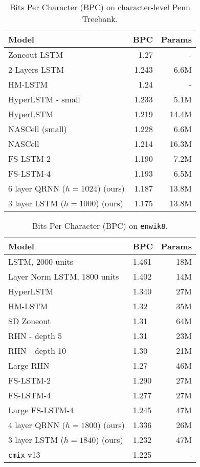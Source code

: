 \documentclass{article}
\newcommand{\enwik}{\texttt{enwik8}\xspace}
\begin{document}
\begin{table}
\begin{center}
 \begin{tabular}{@{}l r r@{}}
\toprule[1.5pt]
Model & BPC & Params \\
\midrule
Zoneout LSTM \cite{Krueger2016}& 1.27 & -\\
2-Layers LSTM \cite{fastslowlm} & 1.243 & 6.6M\\
 HM-LSTM \cite{chung2016hierarchical}& 1.24 & - \\
 HyperLSTM - small \cite{ha2016hypernetworks}& 1.233 & 5.1M \\
 HyperLSTM \cite{ha2016hypernetworks} & 1.219 & 14.4M \\
 NASCell (small) \cite{Zoph2016} & 1.228 & 6.6M \\
 NASCell \cite{Zoph2016} & 1.214 & 16.3M \\
 FS-LSTM-2 \cite{fastslowlm} & 1.190 & 7.2M \\
 FS-LSTM-4 \cite{fastslowlm} & 1.193 & 6.5M \\
 \midrule
 6 layer QRNN ($h=1024$) (ours) & 1.187 & 13.8M \\
 3 layer LSTM ($h=1000$) (ours) & 1.175 & 13.8M \\
 \bottomrule
\end{tabular}
\end{center}
\caption{Bits Per Character (BPC) on character-level Penn Treebank.}
\label{table:ptb}
\end{table}

\begin{table}
\begin{center}
 \begin{tabular}{@{} llr @{}}
 \toprule[1.5pt]
 Model & BPC & Params \\
 \midrule
 LSTM, $2000$ units \cite{fastslowlm} & 1.461 & 18M \\
 Layer Norm LSTM, $1800$ units & 1.402 & 14M\\
 HyperLSTM \cite{ha2016hypernetworks} & 1.340 & 27M \\
 HM-LSTM \cite{chung2016hierarchical}& 1.32 & 35M \\
 SD Zoneout \cite{rocki2016surprisal} & 1.31 & 64M \\
 RHN - depth 5 \cite{Zilly2016}& 1.31 & 23M \\
 RHN - depth 10  \cite{Zilly2016}& 1.30 & 21M \\
 Large RHN \cite{Zilly2016}& 1.27 & 46M \\
 FS-LSTM-2 \cite{fastslowlm} & 1.290 & 27M \\
 FS-LSTM-4 \cite{fastslowlm} & 1.277 & 27M \\
 Large FS-LSTM-4 \cite{fastslowlm} & 1.245 & 47M \\
 \midrule
 4 layer QRNN ($h=1800$) (ours) & 1.336 & 26M \\
 3 layer LSTM ($h=1840$) (ours) & 1.232 & 47M \\
 \midrule
 \texttt{cmix} v13 \cite{cmix}  & 1.225 & - \\
 \bottomrule
\end{tabular}
\end{center}
\caption{Bits Per Character (BPC) on \enwik.}
\label{table:enwik8}
\end{table}
\end{document}
